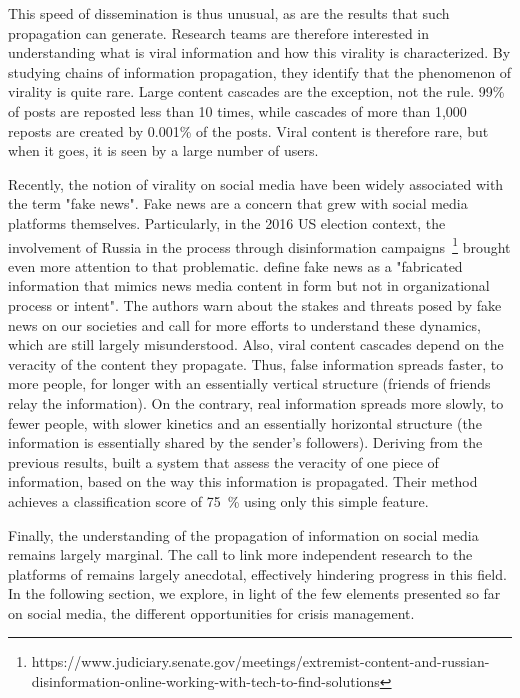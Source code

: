 This speed of dissemination is thus unusual, as are the results that such propagation can generate.
Research teams are therefore interested in understanding what is viral information and how this virality is characterized.
By studying chains of information propagation, they identify that the phenomenon of virality is quite rare.
Large content cascades are the exception, not the rule.
99\% of posts are reposted less than 10 times, while cascades of more than 1,000 reposts are created by 0.001\% of the posts.
Viral content is therefore rare, but when it goes, it is seen by a large number of users.

Recently, the notion of virality on social media have been widely associated with the term "fake news".
Fake news are a concern that grew with social media platforms themselves.
Particularly, in the 2016 US election context, the involvement of Russia in the process through disinformation campaigns~\footnote{https://www.judiciary.senate.gov/meetings/extremist-content-and-russian-disinformation-online-working-with-tech-to-find-solutions}
brought even more attention to that problematic.
\cite{lazerScienceFakeNews2018} define fake news as a "fabricated information that mimics news media content in form but not in organizational process or intent".
The authors warn about the stakes and threats posed by fake news on our societies and call for more efforts to understand these dynamics, which are still largely misunderstood.
Also, viral content cascades depend on the veracity of the content they propagate.
Thus, false information spreads faster, to more people, for longer with an essentially vertical structure (friends of friends relay the information).
On the contrary, real information spreads more slowly, to fewer people, with slower kinetics and an essentially horizontal structure (the information is essentially shared by the sender's followers).
Deriving from the previous results, \cite{vosoughiRumorGaugePredicting2017} built a system that assess the veracity of one piece of information, based on the way this information is propagated.
Their method achieves a classification score of 75~\% using only this simple feature.

Finally, the understanding of the propagation of information on social media remains largely marginal.
The call to link more independent research to the platforms of \cite{lazerScienceFakeNews2018} remains largely anecdotal, effectively hindering progress in this field.
In the following section, we explore, in light of the few elements presented so far on social media, the different opportunities for crisis management.

